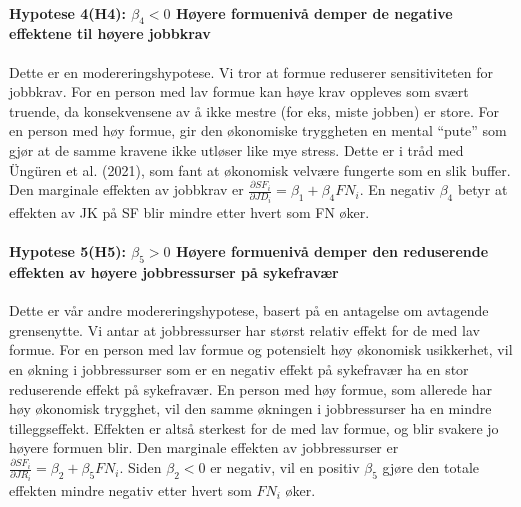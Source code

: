 \documentclass[
  12pt,
  a4paper,
  DIV=11,
  numbers=noendperiod]{scrartcl}
\let\oldparagraph\paragraph
\renewcommand{\paragraph}[1]{\oldparagraph{#1}\mbox{}}
\begin{document}
\paragraph{\texorpdfstring{Hypotese 4(H4): \(\beta_4 < 0\) Høyere
formuenivå demper de negative effektene til høyere
jobbkrav}{Hypotese 4(H4): \textbackslash beta\_4 \textless{} 0 Høyere formuenivå demper de negative effektene til høyere jobbkrav}}\label{hypotese-4h4-beta_4-0-huxf8yere-formuenivuxe5-demper-de-negative-effektene-til-huxf8yere-jobbkrav}

Dette er en modereringshypotese. Vi tror at formue reduserer
sensitiviteten for jobbkrav. For en person med lav formue kan høye krav
oppleves som svært truende, da konsekvensene av å ikke mestre (for eks,
miste jobben) er store. For en person med høy formue, gir den økonomiske
tryggheten en mental ``pute'' som gjør at de samme kravene ikke utløser
like mye stress. Dette er i tråd med Üngüren et al. (2021), som fant at
økonomisk velvære fungerte som en slik buffer. Den marginale effekten av
jobbkrav er
\(\frac{\partial SF_i}{\partial JD_i} = \beta_1 + \beta_4 FN_i\). En
negativ \(\beta_4\) betyr at effekten av JK på SF blir mindre etter
hvert som FN øker.

\paragraph{\texorpdfstring{Hypotese 5(H5): \(\beta_5 > 0\) Høyere
formuenivå demper den reduserende effekten av høyere jobbressurser på
sykefravær}{Hypotese 5(H5): \textbackslash beta\_5 \textgreater{} 0 Høyere formuenivå demper den reduserende effekten av høyere jobbressurser på sykefravær}}\label{hypotese-5h5-beta_5-0-huxf8yere-formuenivuxe5-demper-den-reduserende-effekten-av-huxf8yere-jobbressurser-puxe5-sykefravuxe6r}

Dette er vår andre modereringshypotese, basert på en antagelse om
avtagende grensenytte. Vi antar at jobbressurser har størst relativ
effekt for de med lav formue. For en person med lav formue og potensielt
høy økonomisk usikkerhet, vil en økning i jobbressurser som er en
negativ effekt på sykefravær ha en stor reduserende effekt på
sykefravær. En person med høy formue, som allerede har høy økonomisk
trygghet, vil den samme økningen i jobbressurser ha en mindre
tilleggseffekt. Effekten er altså sterkest for de med lav formue, og
blir svakere jo høyere formuen blir. Den marginale effekten av
jobbressurser er
\(\frac{\partial SF_i}{\partial JR_i} = \beta_2 + \beta_5 FN_i\). Siden
\(\beta_2 < 0\) er negativ, vil en positiv \(\beta_5\) gjøre den totale
effekten mindre negativ etter hvert som \(FN_i\) øker.
\end{document}
